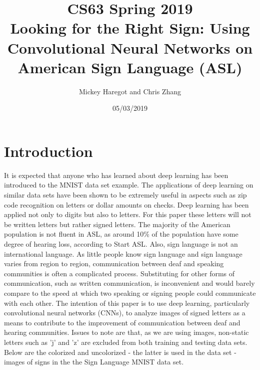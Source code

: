 \documentclass[11pt]{article}
\title{CS63 Spring 2019\\Looking for the Right Sign: Using Convolutional Neural Networks on American Sign Language (ASL)}
\author{Mickey Haregot and Chris Zhang}
\date{05/03/2019}
\begin{document}
\maketitle

\section{Introduction}


It is expected that anyone who has learned about deep learning has been introduced to the MNIST data set example. The applications of deep learning on similar data sets have been shown to be extremely useful in aspects such as zip code recognition on letters or dollar amounts on checks. Deep learning has been applied not only to digits but also to letters. For this paper these letters will not be written letters but rather signed letters. The majority of the American population is not fluent in ASL, as around 10\% of the population have some degree of hearing loss, according to Start ASL. Also, sign language is not an international language. As little people know sign language and sign language varies from region to region, communication between deaf and speaking communities is often a complicated process. Substituting for other forms of communication, such as written communication, is inconvenient and would barely compare to the speed at which two speaking or signing people could communicate with each other. The intention of this paper is to use deep learning, particularly convolutional neural networks (CNNs), to analyze images of signed letters as a means to contribute to the improvement of communication between deaf and hearing communities. Issues to note are that, as we are using images, non-static letters such as 'j' and 'z' are excluded from both training and testing data sets. Below are the colorized and uncolorized - the latter is used in the data set - images of signs in the the Sign Language MNIST data set. \\
\end{document}
